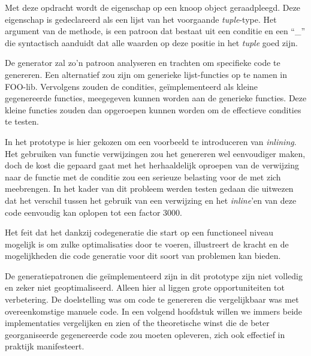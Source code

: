 Met deze opdracht wordt de eigenschap  op een knoop object
geraadpleegd. Deze eigenschap is gedeclareerd als een lijst van het voorgaande
\emph{tuple}-type. Het argument van de  methode, is een patroon dat
bestaat uit een conditie  en een ``\_'' die
syntactisch aanduidt dat alle waarden op deze positie in het \emph{tuple} goed
zijn.

De generator zal zo'n patroon analyseren en trachten om specifieke code te
genereren. Een alternatief zou zijn om generieke lijst-functies op te namen in
FOO-lib. Vervolgens zouden de condities, ge\"implementeerd als kleine
gegenereerde functies, meegegeven kunnen worden aan de generieke functies. Deze
kleine functies zouden dan opgeroepen kunnen worden om de effectieve condities
te testen.

In het prototype is hier gekozen om een voorbeeld te introduceren van
\emph{inlining}. Het gebruiken van functie verwijzingen zou het genereren wel
eenvoudiger maken, doch de kost die gepaard gaat met het herhaaldelijk oproepen
van de verwijzing naar de functie met de conditie zou een serieuze belasting
voor de \mcu met zich meebrengen. In het kader van dit probleem werden testen
gedaan die uitwezen dat het verschil tussen het gebruik van een verwijzing en
het \emph{inline}'en van deze code eenvoudig kan oplopen tot een factor 3000.

\vspace{5mm}

Het feit dat het dankzij codegeneratie die start op een functioneel niveau
mogelijk is om zulke optimalisaties door te voeren, illustreert de kracht en de
mogelijkheden die code generatie voor dit soort van problemen kan bieden.

De generatiepatronen die ge\"implementeerd zijn in dit prototype zijn niet
volledig en zeker niet geoptimaliseerd. Alleen hier al liggen grote
opportuniteiten tot verbetering. De doelstelling was om code te genereren die
vergelijkbaar was met overeenkomstige manuele code. In een volgend hoofdstuk
willen we immers beide implementaties vergelijken en zien of the theoretische
winst die de beter georganiseerde gegenereerde code zou moeten opleveren, zich
ook effectief in praktijk manifesteert.
